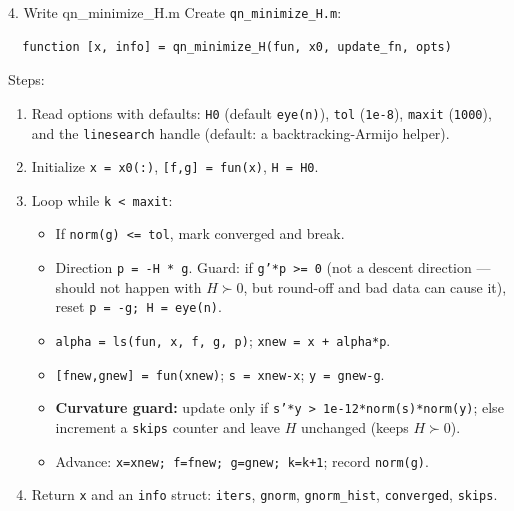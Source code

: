 \documentclass[11pt,letterpaper]{article}
\begin{document}
\begin{exercise}{4. Write qn\_minimize\_H.m}
Create \texttt{qn\_minimize\_H.m}:
\begin{verbatim}
  function [x, info] = qn_minimize_H(fun, x0, update_fn, opts)
\end{verbatim}
Steps:
\begin{enumerate}[nosep]
  \item Read options with defaults: \texttt{H0} (default \texttt{eye(n)}),
    \texttt{tol} (\texttt{1e-8}), \texttt{maxit} (\texttt{1000}), and the
    \texttt{linesearch} handle (default: a backtracking-Armijo helper).
  \item Initialize \texttt{x = x0(:)}, \texttt{[f,g] = fun(x)}, \texttt{H = H0}.
  \item Loop while \texttt{k < maxit}:
    \begin{itemize}[nosep]
      \item If \texttt{norm(g) <= tol}, mark converged and break.
      \item Direction \texttt{p = -H * g}. Guard: if \texttt{g'*p >= 0} (not a descent
        direction --- should not happen with $H\succ0$, but round-off and bad data can
        cause it), reset \texttt{p = -g; H = eye(n)}.
      \item \texttt{alpha = ls(fun, x, f, g, p)}; \texttt{xnew = x + alpha*p}.
      \item \texttt{[fnew,gnew] = fun(xnew)}; \texttt{s = xnew-x}; \texttt{y = gnew-g}.
      \item \textbf{Curvature guard:} update only if
        \texttt{s'*y > 1e-12*norm(s)*norm(y)}; else increment a \texttt{skips} counter
        and leave $H$ unchanged (keeps $H\succ0$).
      \item Advance: \texttt{x=xnew; f=fnew; g=gnew; k=k+1}; record \texttt{norm(g)}.
    \end{itemize}
  \item Return \texttt{x} and an \texttt{info} struct: \texttt{iters},
    \texttt{gnorm}, \texttt{gnorm\_hist}, \texttt{converged}, \texttt{skips}.
\end{enumerate}
\end{exercise}
\end{document}
